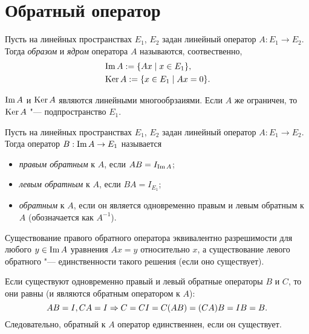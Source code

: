 \documentclass[main]{subfiles}
\begin{document}
\section{Обратный оператор}

\begin{definition}
  Пусть на линейных пространствах \( E_1 \), \( E_2 \)
  задан линейный оператор \( A : E_1 \to E_2 \).
  Тогда \emph{образом} и \emph{ядром} оператора \( A \)
  называются, соотвественно,
  \begin{align}
    &\operatorname{Im} A := \{ A x \mid x \in E_1 \}, \\
    &\operatorname{Ker} A := \{ x \in E_1 \mid A x = 0 \}.
  \end{align}
\end{definition}

\begin{remark}
  \( \operatorname{Im} A \) и \( \operatorname{Ker} A \)
  являются линейными многообрзаиями.
  Если \( A \) же ограничен, то
  \( \operatorname{Ker} A \) "--- подпространство \( E_1 \).
\end{remark}

\begin{definition}
  Пусть на линейных пространствах \( E_1 \), \( E_2 \)
  задан линейный оператор \( A : E_1 \to E_2 \).
  Тогда оператор \( B : \operatorname{Im} A \to E_1 \) называется
  \begin{itemize}
    \item \emph{правым обратным} к \( A \),
      если \( AB = I_{\operatorname{Im} A} \);
    \item \emph{левым обратным} к \( A \),
      если \( BA = I_{E_1} \);
    \item \emph{обратным} к \( A \),
      если он является одновременно правым и левым обратным
      к \( A \) (обозначается как \( A^{-1} \)).
  \end{itemize}
\end{definition}

\begin{remark}
  Существование правого обратного оператора эквивалентно
  разрешимости для любого \( y \in \operatorname{Im} A \)
  уравнения \( A x = y \) относительно \( x \),
  а существование левого обратного "---
  единственности такого решения (если оно существует).
\end{remark}

\begin{remark}
  Если существуют одновременно
  правый и левый обратные операторы
  \( B \) и \( C \),
  то они равны
  (и являются обратным оператором к \( A \)):
  \[
    AB = I, CA = I \Rightarrow
    C = C I = C (AB) = (CA) B = I B = B.
  \]
  Следовательно, обратный к \( A \) оператор
  единственнен, если он существует.
\end{remark}
\end{document}
